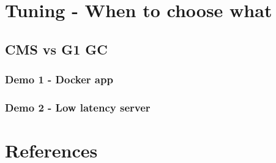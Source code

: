 \documentclass{beamer}
\begin{document}
\section{Tuning - When to choose what}
    \subsection{CMS vs G1 GC}
    \subsubsection{Demo 1 - Docker app}
    \subsubsection{Demo 2 - Low latency server}


\section*{References}
\end{document}
